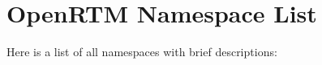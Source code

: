 \section{Open\-RTM Namespace List}
Here is a list of all namespaces with brief descriptions:\begin{CompactList}
\item{}
\item{}
\end{CompactList}

